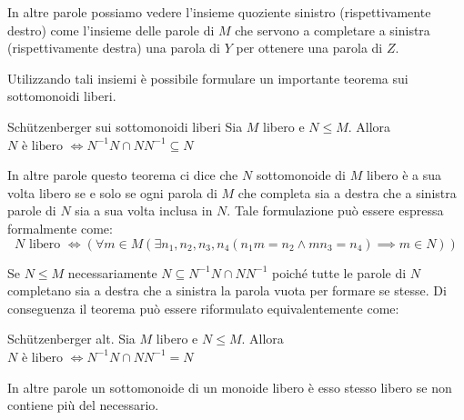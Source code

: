 In altre parole possiamo vedere l'insieme quoziente sinistro (rispettivamente destro) come l'insieme delle parole di \(M\) che servono a completare a sinistra (rispettivamente destra) una parola di \(Y\) per ottenere una parola di \(Z\).

Utilizzando tali insiemi è possibile formulare un importante teorema sui sottomonoidi liberi.

\begin{theorem}[namedlabel={thm:schützenberger_monoids}{Schützenberger sui sottomonoidi liberi}]{Schützenberger sui sottomonoidi liberi}
  Sia \(M\) libero e \(N \leq M\). Allora \(N \text{ è libero } \iff N^{-1}N \cap NN^{-1} \subseteq N\)
\end{theorem}
In altre parole questo teorema ci dice che \(N\) sottomonoide di \(M\) libero è a sua volta libero se e solo se ogni parola di \(M\) che completa sia a destra che a sinistra parole di \(N\) sia a sua volta inclusa in \(N\).
Tale formulazione può essere espressa formalmente come:
\[N \text{ libero } \iff \left(\forall m \in M (\exists n_1,n_2,n_3,n_4( n_1m=n_2 \land mn_3=n_4) \implies m \in N)\right)\]

\begin{observation}{}
  Se \(N\leq M\) necessariamente \(N \subseteq N^{-1}N \cap NN^{-1}\) poiché tutte le parole di \(N\) completano sia a destra che a sinistra la parola vuota per formare se stesse.
  Di conseguenza il teorema può essere riformulato equivalentemente come:
  \begin{theorem}{Schützenberger alt.}
    Sia \(M\) libero e \(N \leq M\). Allora \(N \text{ è libero } \iff N^{-1}N \cap NN^{-1} = N\)
  \end{theorem}
  In altre parole un sottomonoide di un monoide libero è esso stesso libero se non contiene più del necessario.
\end{observation}

